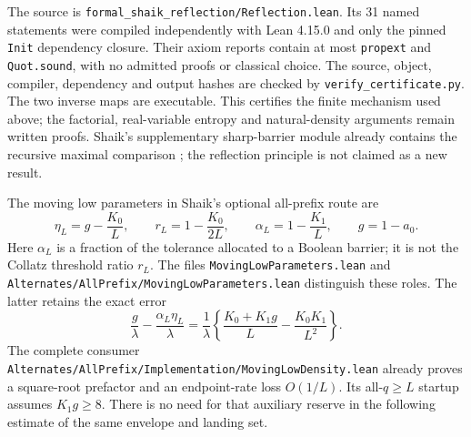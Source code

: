 The source is \texttt{formal\_shaik\_reflection/Reflection.lean}.
Its 31 named statements were compiled independently with Lean 4.15.0
and only the pinned \texttt{Init} dependency closure. Their axiom
reports contain at most \texttt{propext} and \texttt{Quot.sound},
with no admitted proofs or classical choice. The source, object,
compiler, dependency and output hashes are checked by
\texttt{verify\_certificate.py}. The two inverse maps are executable.
This certifies the finite mechanism used above; the factorial,
real-variable entropy and natural-density arguments remain written
proofs. Shaik's supplementary sharp-barrier module already contains
the recursive maximal comparison \cite{Shaik2026v324}; the reflection
principle is not claimed as a new result.

The moving low parameters in Shaik's optional all-prefix route are
\[
 \eta_L=g-\frac{K_0}{L},\qquad
 r_L=1-\frac{K_0}{2L},\qquad
 \alpha_L=1-\frac{K_1}{L},\qquad g=1-a_0.
\]
Here \(\alpha_L\) is a fraction of the tolerance allocated to a
Boolean barrier; it is not the Collatz threshold ratio \(r_L\).
The files \texttt{MovingLowParameters.lean} and
\texttt{Alternates/AllPrefix/MovingLowParameters.lean} distinguish these
roles. The latter retains the exact error
\[
 \frac g\lambda-\frac{\alpha_L\eta_L}{\lambda}
 =\frac1\lambda\left\{\frac{K_0+K_1g}{L}
                         -\frac{K_0K_1}{L^2}\right\}.
\]
The complete consumer
\texttt{Alternates/AllPrefix/Implementation/MovingLowDensity.lean}
already proves a square-root prefactor and an endpoint-rate loss
\(O(1/L)\). Its all-\(q\ge L\) startup assumes \(K_1g\ge8\).
There is no need for that auxiliary reserve in the following
estimate of the same envelope and landing set.


